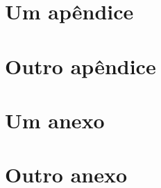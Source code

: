 \documentclass[msc]{ppgccufmg}    %
\begin{document}


\begin{appendices}

\chapter{Um apêndice}

\dummytxta
\dummytxtb
\dummytxtc
\dummytxta
\dummytxtb

\chapter{Outro apêndice}

\dummytxta
\dummytxtb
\dummytxtc
\dummytxta
\dummytxtb

\end{appendices}


\begin{attachments}

\chapter{Um anexo}

\dummytxta
\dummytxtb
\dummytxtc
\dummytxta
\dummytxtb

\chapter{Outro anexo}

\dummytxta
\dummytxtb

\end{attachments}
\end{document}

